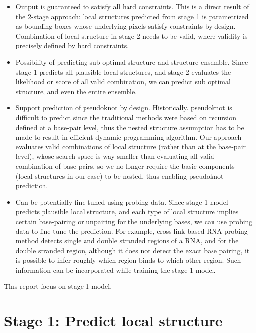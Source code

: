 \documentclass[12pt]{article}
\begin{document}
\begin{itemize}
    \item Output is guaranteed to satisfy all hard constraints.
    This is a direct result of the 2-stage approach:
    local structures predicted from stage 1 is parametrized as bounding boxes whose underlying pixels
    satisfy constraints by design.
    Combination of local structure in stage 2 needs to be valid, where validity is precisely defined by hard constraints.

    \item Possibility of predicting sub optimal structure and structure ensemble.
    Since stage 1 predicts all plausible local structures, and stage 2 evaluates the
    likelihood or score of all valid combination, we can predict sub optimal structure,
    and even the entire ensemble.

    \item Support prediction of pseudoknot by design.
    Historically. pseudoknot is difficult to predict since the traditional methods
    were based on recursion defined at a base-pair level,
    thus the nested structure assumption has to be made to result in efficient
    dynamic programming algorithm.
    Our approach evaluates valid combinations of local structure
    (rather than at the base-pair level), whose search space is way smaller than
    evaluating all valid combination of base pairs, so we no longer require the basic components
    (local structures in our case) to be nested, thus enabling pseudoknot prediction.

    \item Can be potentially fine-tuned using probing data.
    Since stage 1 model predicts plausible local structure, and each type of local structure
    implies certain base-pairing or unpairing for the underlying bases,
    we can use probing data to fine-tune the prediction.
    For example, cross-link based RNA probing method detects single and double stranded regions of a RNA,
    and for the double stranded region, although it does not detect the exact base pairing,
    it is possible to infer roughly which region binds to which other region.
    Such information can be incorporated while training the stage 1 model.

\end{itemize}

This report focus on stage 1 model.


\section{Stage 1: Predict local structure}
\end{document}
